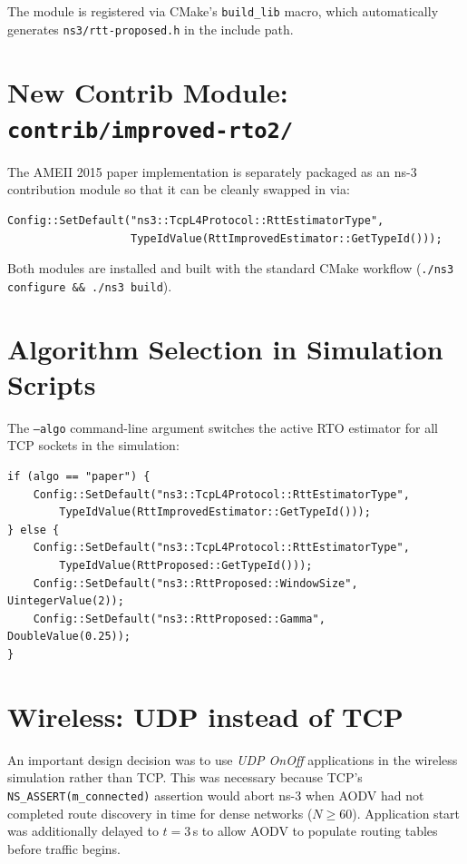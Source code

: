\documentclass[12pt,a4paper]{report}
\begin{document}
The module is registered via CMake's \texttt{build\_lib} macro, which
automatically generates \texttt{ns3/rtt-proposed.h} in the include path.

\section{New Contrib Module: \texttt{contrib/improved-rto2/}}

The AMEII 2015 paper implementation is separately packaged as an ns-3
contribution module so that it can be cleanly swapped in via:

\begin{lstlisting}[style=cppstyle]
Config::SetDefault("ns3::TcpL4Protocol::RttEstimatorType",
                   TypeIdValue(RttImprovedEstimator::GetTypeId()));
\end{lstlisting}

\noindent Both modules are installed and built with the standard CMake
workflow (\texttt{./ns3 configure \&\& ./ns3 build}).

\section{Algorithm Selection in Simulation Scripts}

The \texttt{--algo} command-line argument switches the active RTO estimator
for all TCP sockets in the simulation:

\begin{lstlisting}[style=cppstyle, caption={Algorithm selection in wired-sim.cc}]
if (algo == "paper") {
    Config::SetDefault("ns3::TcpL4Protocol::RttEstimatorType",
        TypeIdValue(RttImprovedEstimator::GetTypeId()));
} else {
    Config::SetDefault("ns3::TcpL4Protocol::RttEstimatorType",
        TypeIdValue(RttProposed::GetTypeId()));
    Config::SetDefault("ns3::RttProposed::WindowSize", UintegerValue(2));
    Config::SetDefault("ns3::RttProposed::Gamma",      DoubleValue(0.25));
}
\end{lstlisting}

\section{Wireless: UDP instead of TCP}

An important design decision was to use \emph{UDP OnOff} applications in the
wireless simulation rather than TCP.  This was necessary because TCP's
\texttt{NS\_ASSERT(m\_connected)} assertion would abort ns-3 when AODV had not
completed route discovery in time for dense networks ($N \geq 60$).  Application
start was additionally delayed to $t=3$\,s to allow AODV to populate routing
tables before traffic begins.
\end{document}
